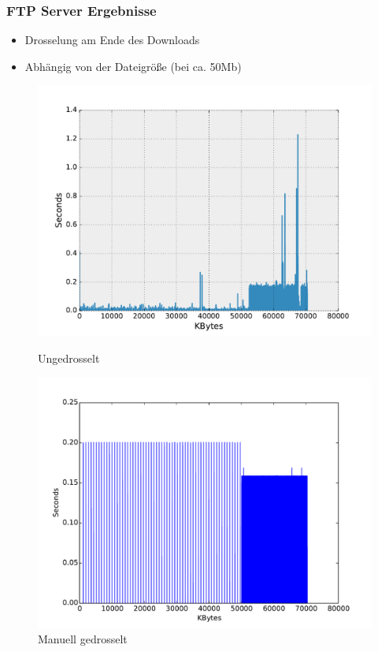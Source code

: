 \documentclass[handout]{beamer}
\begin{document}
\begin{frame}
\frametitle{FTP Server Ergebnisse}
\begin{itemize}
\item Drosselung am Ende des Downloads
\item Abhängig von der Dateigröße (bei ca. 50Mb)
\end{itemize}
\begin{figure}
\centering
\begin{minipage}[t]{0.4\linewidth}
			\centering
			\includegraphics[width=\linewidth]{images/seconds_ftp.pdf}
			\caption{Ungedrosselt}
\end{minipage}
\begin{minipage}[t]{0.4\linewidth}
			\centering
			\includegraphics[width=\linewidth]{images/seconds_ftp_2.pdf}
			\caption{Manuell gedrosselt}
\end{minipage}
\end{figure}
\end{frame}
\end{document}
